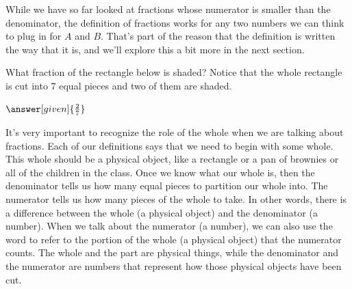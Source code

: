\documentclass{ximera}
\begin{document}
While we have so far looked at fractions whose numerator is smaller than the denominator, the definition of fractions works for any two numbers we can think to plug in for $A$ and $B$. That's part of the reason that the definition is written the way that it is, and we'll explore this a bit more in the next section.

\begin{question}
What fraction of the rectangle below is shaded? Notice that the whole rectangle is cut into $7$ equal pieces and two of them are shaded.
\begin{image}
\end{image}

\begin{prompt}
$\answer[given]{\frac{2}{7}}$
\end{prompt}
\end{question}

It's very important to recognize the role of the whole when we are talking about fractions. Each of our definitions says that we need to begin with some whole. This whole should be a physical object, like a rectangle or a pan of brownies or all of the children in the class. Once we know what our whole is, then the denominator tells us how many equal pieces to partition our whole into. The numerator tells us how many pieces of the whole to take. In other words, there is a difference between the whole (a physical object) and the denominator (a number). When we talk about the numerator (a number), we can also use the word  to refer to the portion of the whole (a physical object) that the numerator counts. The whole and the part are physical things, while the denominator and the numerator are numbers that represent how those physical objects have been cut.
\end{document}

